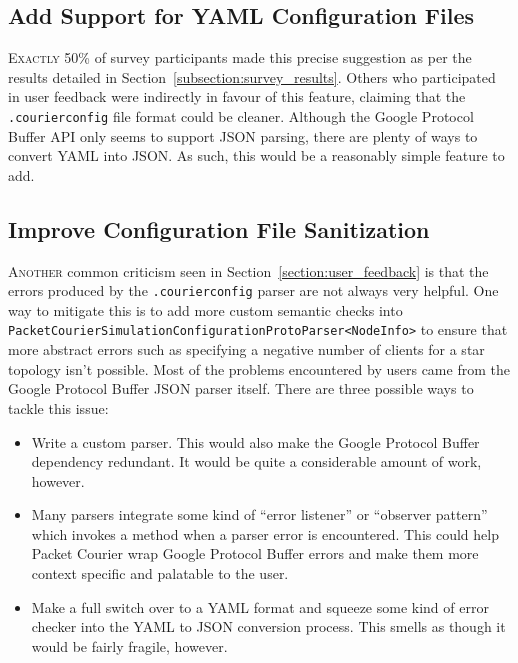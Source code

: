 \subsection{Add Support for YAML Configuration Files}\label{subsection:support_for_yaml_configuration_files}

\lettrine{E}{xactly} 50\% of survey participants made this precise suggestion as per the results detailed in
Section~\ref{subsection:survey_results}. Others who participated in user feedback were indirectly in favour of this
feature, claiming that the \texttt{.courierconfig} file format could be cleaner. Although the Google Protocol Buffer
API only seems to support JSON parsing\cite{com_google_protobuf_util}, there are plenty of ways to convert YAML into
JSON\cite{yaml_to_json}. As such, this would be a reasonably simple feature to add.

\subsection{Improve Configuration File Sanitization}\label{subsection:improve_configuration_file_sanitization}

\lettrine{A}{nother} common criticism seen in Section~\ref{section:user_feedback} is that the errors produced by the
\texttt{.courierconfig} parser are not always very helpful. One way to mitigate this is to add more custom semantic
checks into \texttt{PacketCourierSimulationConfigurationProtoParser<NodeInfo>} to ensure that more abstract errors
such as specifying a negative number of clients for a star topology isn't possible. Most of the problems encountered
by users came from the Google Protocol Buffer JSON parser itself. There are three possible ways to tackle this issue:
\begin{itemize}
    \item Write a custom parser. This would also make the Google Protocol Buffer dependency redundant. It would be
    quite a considerable amount of work, however.
    \item Many parsers integrate some kind of ``error listener'' or ``observer pattern''\cite{observer_pattern} which
    invokes a method when a parser error is encountered. This could help Packet Courier wrap Google Protocol Buffer
    errors and make them more context specific and palatable to the user.
    \item Make a full switch over to a YAML format and squeeze some kind of error checker into the YAML to JSON
    conversion process. This smells as though it would be fairly fragile, however.
\end{itemize}

